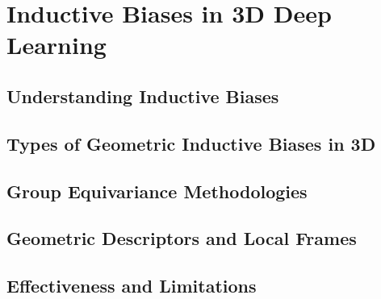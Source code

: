 \section{Inductive Biases in 3D Deep Learning}

\subsection{Understanding Inductive Biases}

\subsection{Types of Geometric Inductive Biases in 3D}

\subsection{Group Equivariance Methodologies}

\subsection{Geometric Descriptors and Local Frames}

\subsection{Effectiveness and Limitations}





